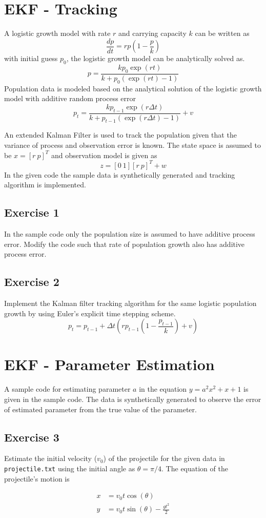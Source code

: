 \documentclass{article}
\begin{document}
\section{EKF - Tracking}
A logistic growth model with rate $r$ and carrying capacity $k$ can be written as
$$
\frac{dp}{dt}=rp\left( 1-\frac{p}{k}\right)
$$
with initial guess $p_0$, the logistic growth model can be analytically solved as.
$$
p=\frac{kp_0\exp(rt)}{k+p_0(\exp(rt)-1)}
$$
Population data is modeled based on the analytical solution of the logistic growth model with additive random process error
$$
p_{t}=\frac{kp_{t-1}\exp(r \Delta t)}{k+p_{t-1}(\exp(r \Delta t)-1)} + v
$$

An extended Kalman Filter is used to track the population given that the variance of process and observation error is known. The state space is assumed to be $x=[r \>  p]^T$ and observation model is given as
$$
z=[0 \>  1][r \>  p]^T+w
$$
In the given code the sample data is  synthetically generated and tracking algorithm is implemented.

\subsection{Exercise 1}
In the sample code only the population size is assumed to have additive process error. Modify the code such that rate of population growth also has additive process error. 

\subsection{Exercise 2}
Implement the Kalman filter tracking algorithm for the same logistic population growth by using Euler's explicit time stepping scheme.
$$
p_t=p_{t-1}+\Delta t \left( rp_{t-1}\left( 1-\frac{p_{t-1}}{k}\right)+ v\right )
$$

\section{EKF - Parameter Estimation}

A sample code for estimating parameter $a$ in the equation $y=a^2x^2+x+1$ is given in the sample code.  The data is synthetically generated to observe the error of estimated parameter from the true value of the parameter.

\subsection{Exercise 3}
Estimate the initial velocity ($v_0$) of the projectile for the given data in {\tt projectile.txt} using the initial angle as $\theta = \pi/4$. 
The equation of the projectile's motion is

\begin{equation*}
\begin{split}
x & =v_0t\cos(\theta) \\
y & =v_0t\sin(\theta)-\frac{gt^2}{2}
\end{split}
\end{equation*}
\end{document}
